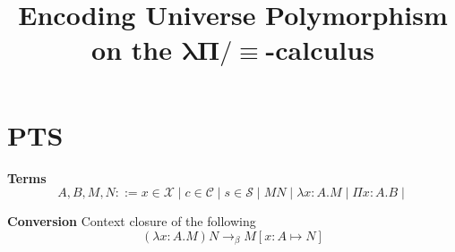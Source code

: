 \documentclass[]{StandardTemplate}
\title{Encoding Universe Polymorphism on the $ \boldsymbol\lambda \boldsymbol \Pi \boldsymbol /  \boldsymbol \equiv $-calculus}
\begin{document}
\maketitle
{}
\newcommand{\Type}{\textbf{Type}}
\newcommand{\Kind}{\textbf{Kind}}
\newcommand{\Set}{\textbf{Set}}
\newcommand{\Prop}{\textbf{Prop}}
\newcommand{\N}{\mathbb{N}}
\newcommand{\gray}[1]{\textcolor{mygray}{#1}}
\newcommand{\red}{\longrightarrow}

\newcommand{\margincom}[1]{%
        \refstepcounter{margincount}%
        \textsuperscript{\themargincount}%
        \marginpar{\vspace{-2em}\footnotesize \textsuperscript{\themargincount}\gray{#1}}}


\newcommand{\citemargin}[1]{%
        \cite{#1}
        \marginpar{\vspace{-2em}\footnotesize \gray{\cite{#1} \citeauthor{#1}, \citetitle{#1}}}}





      \newcommand{\nType}{\tex{Type}}
\newcommand{\nKind}{\text{Kind}}
\newcommand{\nSet}{\text{Set}}
\newcommand{\nProp}{\text{Prop}}
\newcommand{\Lvl}{\text{Lvl}}
\newcommand{\suc}{\text{S}}


\section{PTS}
\label{sec:pts}

\textbf{Terms}
\[
  A, B, M, N ::=
  x \in \mathcal{X} \mid
  c \in \mathcal{C} \mid
  s \in \mathcal{S} \mid
  M N \mid
  \lambda x : A. M \mid
  \Pi x : A. B \mid
\]

\textbf{Conversion}
Context closure of the following
\[
(\lambda x : A. M) N \red_\beta M [x : A \mapsto N]
\]
\end{document}
